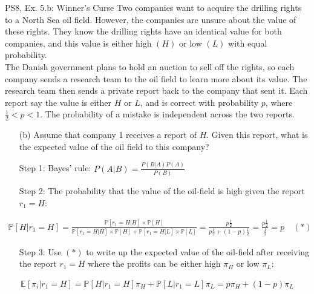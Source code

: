 \begin{frame}{PS8, Ex. 5.b: Winner's Curse}
      Two companies want to acquire the drilling rights to a North Sea oil field. However, the companies are unsure about the value of these rights. They know the drilling rights have an identical value for both companies, and this value is either high $(H)$ or low $(L)$ with equal probability.\\\smallskip
      The Danish government plans to hold an auction to sell off the rights, so each company sends a research team to the oil field to learn more about its value. The research team then sends a private report back to the company that sent it. Each report say the value is either $H$ or $L$, and is correct with probability $p$, where $\frac{1}{2} < p < 1$. The probability of a mistake is independent across the two reports.
      \begin{itemize}
        \item[(b)] Assume that company 1 receives a report of $H$. Given this report, what is the expected value of the oil field to this company?
        \item[Step 1:] Bayes' rule: $P(A|B)=\frac{P(B|A)P(A)}{P(B)}$
        \item[Step 2:] The probability that the value of the oil-field is high given the report $r_1=H$:
        \end{itemize}
        \vspace{-8pt}
        \begin{align*}
          \mathbb{P}[H|r_1=H]=\frac{\mathbb{P}[r_1=H|H]\times\mathbb{P}[H]}{\mathbb{P}[r_1=H|H]\times\mathbb{P}[H]+\mathbb{P}[r_1=H|L]\times\mathbb{P}[L]}=\frac{p\frac{1}{2}}{p\frac{1}{2}+(1-p)\frac{1}{2}}=\frac{p\frac{1}{2}}{\frac{1}{2}}=p\quad (*)
        \end{align*}
        \vspace{-10pt}
        \begin{itemize}
        \item[Step 3:] Use $(*)$ to write up the expected value of the oil-field after receiving the report $r_1=H$ where the profits can be either high $\pi_H$ or low $\pi_L$:
      \end{itemize}
      \vspace{-6pt}
      \begin{align*}
        \mathbb{E}[\pi_i|r_1=H]=\mathbb{P}[H|r_1=H]\pi_H+\mathbb{P}[L|r_1=L]\pi_L=p\pi_H+(1-p)\pi_L
      \end{align*}
      \vfill\null
\end{frame}


